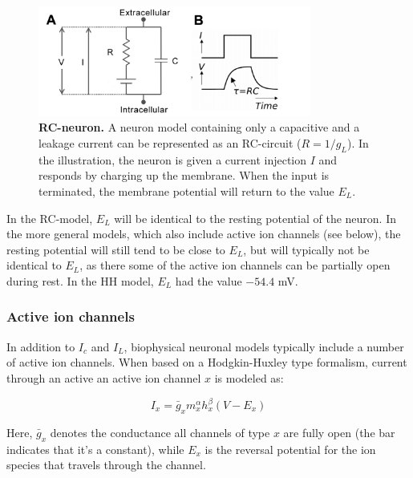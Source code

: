 \begin{figure}[!ht]
\begin{center}
\includegraphics[width=0.8\textwidth]{Fig02/RCneuron.png}
\end{center}
\caption{\textbf{RC-neuron.}  A neuron model containing only a capacitive and a leakage current can be represented as an RC-circuit ($R = 1/g_L$). In the illustration, the neuron is given a current injection $I$ and responds by charging up the membrane. When the input is terminated, the membrane potential will return to the value $E_L$.
}
\label{fig:RC}
\end{figure}

In the RC-model, $E_L$ will be identical to the resting potential of the neuron. In the more general models, which also include active ion channels (see below), the resting potential will still tend to be close to $E_L$, but will typically not be identical to $E_L$, as there some of the active ion channels can be partially open during rest. In the HH model, $E_L$ had the value $-54.4$ mV. 


\subsubsection{Active ion channels}
In addition to $I_c$ and $I_L$, biophysical neuronal models typically include a number of active ion channels. When based on a Hodgkin-Huxley type formalism, current through an active an active ion channel $x$ is modeled as:

\begin{equation}
I_x = \bar{g}_x m_x^{\alpha} h_x^{\beta}(V-E_x)
\label{eq:HHform}
\end{equation}

Here, $\bar{g}_x$ denotes the conductance all channels of type $x$ are fully open (the bar indicates that it's a constant), while $E_x$ is the reversal potential for the ion species that travels through the channel.

